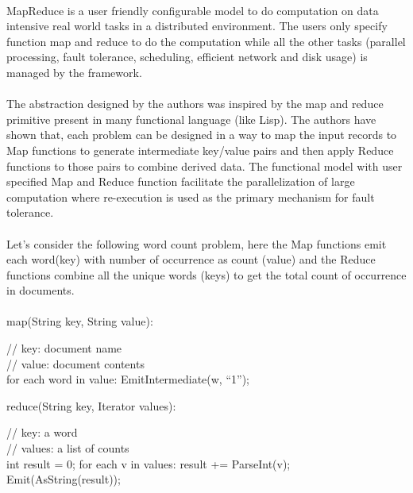 \documentclass[8pt]{extarticle}
\newlength\myindent
\newcommand\bindent{%
	\begingroup
	\setlength{\itemindent}{\myindent}
	\addtolength{\algorithmicindent}{\myindent}
}
\newcommand\eindent{\endgroup}
\begin{document}
\paragraph{}
MapReduce is a user friendly configurable model to do computation on data intensive real world tasks in a distributed environment. The users only specify function map and reduce to do the computation while all the other tasks (parallel processing, fault tolerance, scheduling, efficient network and disk usage) is managed by the framework.

\paragraph{}
The abstraction designed by the authors was inspired by the map and reduce primitive present in many functional language (like Lisp). The authors have shown that, each problem can be designed in a way to map the input records to Map functions to generate intermediate key/value pairs and then apply Reduce functions to those pairs to combine derived data. The functional model with user specified Map and Reduce function facilitate the parallelization of large computation where re-execution is used as the primary mechanism for fault tolerance.

\paragraph{}
Let's consider the following word count problem, here the Map functions emit each word(key) with number of occurrence as count (value) and the Reduce functions combine all the unique words (keys) to get the total count of occurrence in documents.

\paragraph{}
\begin{algorithm}
\begin{algorithmic}
	\STATE map(String key, String value):\\
	\bindent
	\STATE // key: document name\\
	\STATE // value: document contents \\
	\STATE for each word in value:
	\STATE EmitIntermediate(w, “1”);
	\eindent
\end{algorithmic}
\begin{algorithmic}
	\STATE reduce(String key, Iterator values):\\
	\bindent
	\STATE // key: a word \\
	\STATE // values: a list of counts \\
	\STATE int result = 0;
	\STATE for each v in values:
	\STATE result += ParseInt(v);
	\STATE Emit(AsString(result));
	\eindent
\end{algorithmic}		
\end{algorithm}
\end{document}
